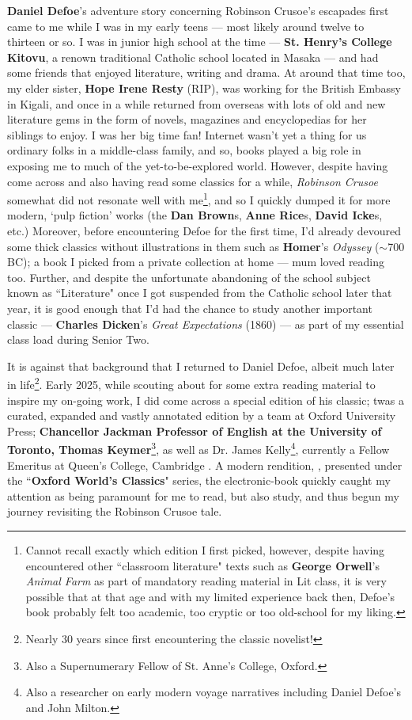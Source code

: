 \documentclass[a4paper]{article}
\begin{document}
\textbf{Daniel Defoe}'s adventure story concerning Robinson Crusoe's escapades first came to me while I was in my early teens --- most likely around twelve to thirteen or so. I was in junior high school at the time --- \textbf{St. Henry's College Kitovu}, a renown traditional Catholic school located in Masaka --- and had some friends that enjoyed literature, writing and drama. At around that time too, my elder sister, \textbf{Hope Irene Resty} (RIP), was working for the British Embassy in Kigali, and once in a while returned from overseas with lots of old and new literature gems in the form of novels, magazines and encyclopedias for her siblings to enjoy. I was her big time fan! Internet wasn't yet a thing for us ordinary folks in a middle-class family, and so, books played a big role in exposing me to much of the yet-to-be-explored world. However, despite having come across and also having read some classics for a while, \textit{Robinson Crusoe} somewhat did not resonate well with me\footnote{Cannot recall exactly which edition I first picked, however, despite having encountered other ``classroom literature" texts such as \textbf{George Orwell}'s \textit{Animal Farm} as part of mandatory reading material in Lit class, it is very possible that at that age and with my limited experience back then, Defoe's book probably felt too academic, too cryptic or too old-school for my liking.}, and so I quickly dumped it for more modern, `pulp fiction' works (the \textbf{Dan Brown}s, \textbf{Anne Rice}s, \textbf{David Icke}s, etc.) Moreover, before encountering Defoe for the first time, I'd already devoured some thick classics without illustrations in them such as \textbf{Homer}'s \textit{Odyssey} ($\sim$700 BC); a book I picked from a private collection at home --- mum loved reading too. Further, and despite the unfortunate abandoning of the  school subject known as ``Literature" once I got suspended from the Catholic school later that year, it is good enough that I'd had the chance to study another important classic --- \textbf{Charles Dicken}'s \textit{Great Expectations} (1860) --- as part of my essential class load during Senior Two.

It is against that background that I returned to Daniel Defoe, albeit much later in life\footnote{Nearly 30 years since first encountering the classic novelist!}. Early 2025, while scouting about for some extra reading material to inspire my on-going work, I did come across a special edition of his classic; twas a curated, expanded and vastly annotated edition by a team at Oxford University Press; \textbf{Chancellor Jackman Professor of English at the University of Toronto, Thomas Keymer}\footnote{Also a Supernumerary Fellow of St. Anne's College, Oxford.}, as well as Dr. James Kelly\footnote{Also a researcher on early modern voyage narratives including Daniel Defoe's and John Milton.}, currently a Fellow Emeritus at Queen's College, Cambridge \cite{copilot_assistant}. A modern rendition, \cite{Defoe2007}, presented under the ``\textbf{Oxford World's Classics}" series, the electronic-book quickly caught my attention as being paramount for me to read, but also study, and thus begun my journey revisiting the Robinson Crusoe tale.
\end{document}
